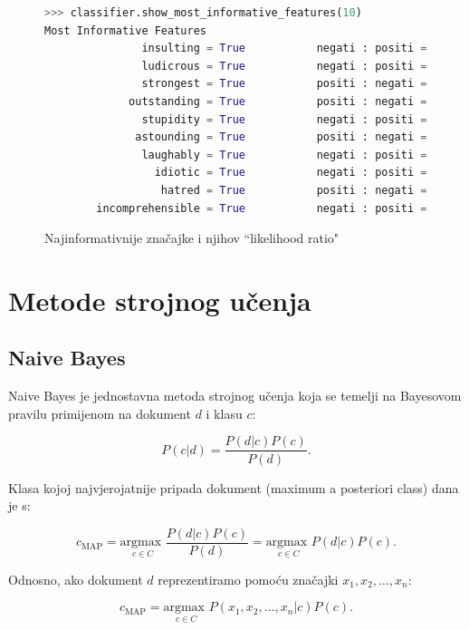 \documentclass[conference]{IEEEtran}
\begin{document}
\begin{figure}[!ht]
\begin{minipage}{0.5\textwidth}
\centering
\begin{lstlisting}[language = Python, frame = single, basicstyle=\tiny\ttfamily, xleftmargin = 5pt, xrightmargin = 5pt]
>>> classifier.show_most_informative_features(10)
Most Informative Features
               insulting = True           negati : positi =     16.9 : 1.0
               ludicrous = True           negati : positi =     12.5 : 1.0
               strongest = True           positi : negati =     11.8 : 1.0
             outstanding = True           positi : negati =     11.5 : 1.0
               stupidity = True           negati : positi =     11.3 : 1.0
              astounding = True           positi : negati =     11.1 : 1.0
               laughably = True           negati : positi =     10.9 : 1.0
                 idiotic = True           negati : positi =     10.5 : 1.0
                  hatred = True           positi : negati =     10.4 : 1.0
        incomprehensible = True           negati : positi =      8.9 : 1.0
\end{lstlisting}
\caption{Najinformativnije značajke i njihov ``likelihood ratio"}
\end{minipage}
\end{figure}

\section{Metode strojnog učenja}

\subsection{Naive Bayes}

Naive Bayes je jednostavna metoda strojnog učenja koja se temelji na Bayesovom pravilu primijenom na dokument $d$ i klasu $c$:

\[P(c|d) = \frac{P(d|c)P(c)}{P(d)}.\]

Klasa kojoj najvjerojatnije pripada dokument (maximum a posteriori class) dana je s:

\[c_{\text{MAP}} = \underset{{c \in C}}{\text{argmax }} \frac{P(d|c)P(c)}{P(d)}
= \underset{{c \in C}}{\text{argmax }} P(d|c)P(c).\] 

Odnosno, ako dokument $d$ reprezentiramo pomoću značajki $x_1, x_2, \ldots, x_n$:

\[c_{\text{MAP}} = \underset{{c \in C}}{\text{argmax }} P(x_1, x_2, \ldots, x_n|c)P(c).\]
\end{document}
